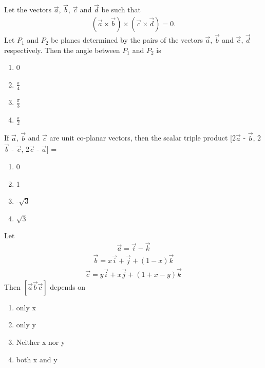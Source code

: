 \item Let the vectors $\overrightarrow{a}$, $\overrightarrow{b}$, $\overrightarrow{c}$ and 
$\overrightarrow{d}$ be such that 
\begin{align*}
(\overrightarrow{a} \times \overrightarrow{b}) \times (\overrightarrow{c} \times \overrightarrow{d}) = 0.
\end{align*}
Let $P_1$ and $P_2$ be planes determined by the pairs of the vectors $\overrightarrow{a}$, $\overrightarrow{b}$ and $\overrightarrow{c}$, $\overrightarrow{d}$ respectively. Then the angle between $P_1$ and $P_2$ is
\begin{enumerate}
\item 0
\item $\frac{\pi}{4}$
\item $\frac{\pi}{3}$
\item $\frac{\pi}{2}$
\end{enumerate}

\item If $\overrightarrow{a}$, $\overrightarrow{b}$ and $\overrightarrow{c}$ are unit co-planar vectors, then the scalar triple product [2$\overrightarrow{a}$ - $\overrightarrow{b}$, 2$\overrightarrow{b}$ - $\overrightarrow{c}$, 2$\overrightarrow{c}$ - $\overrightarrow{a}$] = 
\begin{enumerate}
\item 0
\item 1
\item -$\sqrt{3}$
\item $\sqrt{3}$
\end{enumerate}

\item Let 
\begin{align*}
\overrightarrow{a} = \overrightarrow{i} - \overrightarrow{k}
\end{align*}
\begin{align*}
\overrightarrow{b} = x\overrightarrow{i} + \overrightarrow{j} + (1 - x)\overrightarrow{k}
\end{align*}
\begin{align*}
\overrightarrow{c} = y\overrightarrow{i} + x\overrightarrow{j} + (1 + x -y)\overrightarrow{k}
\end{align*}
Then $[\overrightarrow{a}\overrightarrow{b}\overrightarrow{c}]$ depends on
\begin{enumerate}
\item only x
\item only y
\item Neither x nor y
\item both x and y
\end{enumerate}

